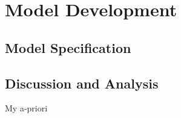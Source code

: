 \section{Model Development}
\subsection{Model Specification}
\subsection{Discussion and Analysis}
My a-priori 